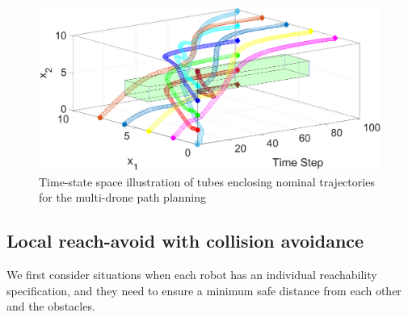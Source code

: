 \begin{figure}[t]
    \large
     \centering
         \includegraphics[width=\columnwidth]{figures/10t_final.eps}
        \caption{Time-state space illustration of tubes enclosing nominal trajectories for the multi-drone path planning}
        \label{fig:3dtubes}
        \vspace{-.3cm}
\end{figure}

\subsection{Local reach-avoid with collision avoidance}
\label{sec:local reach-avoid}
%
We first consider situations when each robot has an individual reachability specification, 
and they need to ensure a minimum safe distance from each other and the obstacles.

